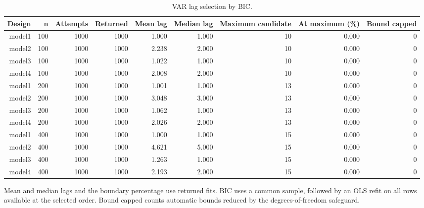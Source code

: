 \begin{table}[p]\centering
\caption{VAR lag selection by BIC.}
\small
\begin{tabular}{rrrrrrrrr}\toprule
Design & n & Attempts & Returned & Mean lag & Median lag & Maximum candidate & At maximum (\%) & Bound capped \\\midrule
model1 & 100 & 1000 & 1000 & 1.000 & 1.000 & 10 & 0.000 & 0 \\
model2 & 100 & 1000 & 1000 & 2.238 & 2.000 & 10 & 0.000 & 0 \\
model3 & 100 & 1000 & 1000 & 1.022 & 1.000 & 10 & 0.000 & 0 \\
model4 & 100 & 1000 & 1000 & 2.008 & 2.000 & 10 & 0.000 & 0 \\
model1 & 200 & 1000 & 1000 & 1.001 & 1.000 & 13 & 0.000 & 0 \\
model2 & 200 & 1000 & 1000 & 3.048 & 3.000 & 13 & 0.000 & 0 \\
model3 & 200 & 1000 & 1000 & 1.062 & 1.000 & 13 & 0.000 & 0 \\
model4 & 200 & 1000 & 1000 & 2.026 & 2.000 & 13 & 0.000 & 0 \\
model1 & 400 & 1000 & 1000 & 1.000 & 1.000 & 15 & 0.000 & 0 \\
model2 & 400 & 1000 & 1000 & 4.621 & 5.000 & 15 & 0.000 & 0 \\
model3 & 400 & 1000 & 1000 & 1.263 & 1.000 & 15 & 0.000 & 0 \\
model4 & 400 & 1000 & 1000 & 2.193 & 2.000 & 15 & 0.000 & 0 \\
\bottomrule\end{tabular}
\par\medskip
\begin{minipage}{0.98\linewidth}\footnotesize Mean and median lags and the boundary percentage use returned fits. BIC uses a common sample, followed by an OLS refit on all rows available at the selected order. Bound capped counts automatic bounds reduced by the degrees-of-freedom safeguard.\end{minipage}
\end{table}
